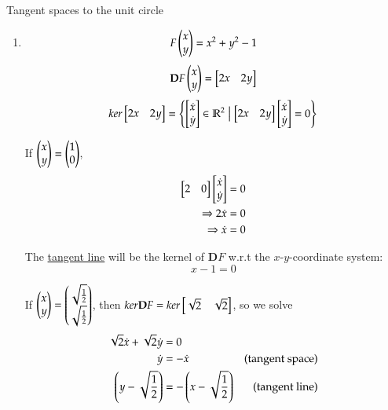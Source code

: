\example Tangent spaces to the unit circle
\begin{enumerate}[1.]
\item
\begin{minipage}{0.7\textwidth}
\[F\begin{pmatrix} x \\ y \end{pmatrix}=x^2+y^2-1\]
\[\textbf{D}F\begin{pmatrix} x \\ y \end{pmatrix}=\begin{bmatrix} 2x & 2y \end{bmatrix}\]
\[ker\begin{bmatrix} 2x & 2y \end{bmatrix} = \left\{ \begin{bmatrix} \dot{x} \\ \dot{y} \end{bmatrix}\in \mathbb{R}^2 \bigm| \begin{bmatrix} 2x & 2y \end{bmatrix}\begin{bmatrix} \dot{x} \\ \dot{y} \end{bmatrix}=0 \right\}\]
\end{minipage}
\begin{minipage}{0.3\textwidth}
If $\begin{pmatrix} x \\ y \end{pmatrix} = \begin{pmatrix} 1 \\ 0 \end{pmatrix}$,
\begin{align*}
  \begin{bmatrix} 2 & 0 \end{bmatrix}\begin{bmatrix} \dot{x} \\ \dot{y} \end{bmatrix} &= 0 \\
  \Rightarrow 2\dot{x} &= 0 \\
  \Rightarrow \dot{x} &= 0
\end{align*}
\end{minipage}

\begin{center}
\end{center}

The \ul{tangent line} will be the kernel of $\bm{D}F$ w.r.t the $x$-$y$-coordinate system:
\[\boxed{x-1=0}\]

If $\begin{pmatrix} x \\ y \end{pmatrix} = \begin{pmatrix} \sqrt{\frac{1}{2}} \\ \sqrt{\frac{1}{2}} \end{pmatrix}$, then $ker \textbf{D}F = ker\begin{bmatrix} \sqrt{2} & \sqrt{2} \end{bmatrix}$, so we solve
\begin{align*}
\sqrt{2}\dot{x}+\sqrt{2}\dot{y}&=0 \\
\dot{y}&=-\dot{x} & \text{(tangent space)} \\
\left( y-\sqrt{\frac{1}{2}} \right) &=-\left( x-\sqrt{\frac{1}{2}} \right) & \text{(tangent line)}
\end{align*}


\end{enumerate}
